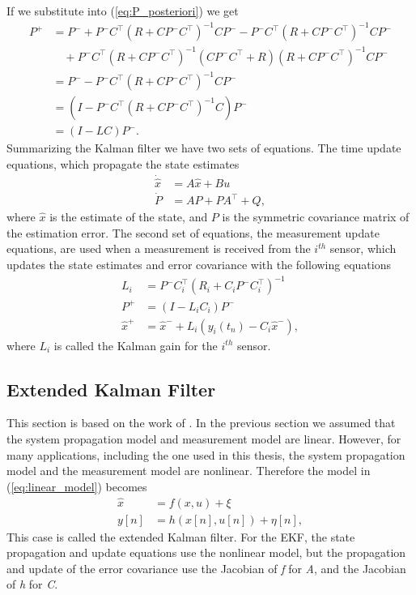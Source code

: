 If we substitute into (\ref{eq:P_posteriori}) we get
\begin{align*}
P^+&= P^-+P^-C^\top(R+CP^-C^\top)^{-1}CP^- -P^-C^\top(R+CP^-C^\top)^{-1}CP^- \\
   &  \quad +P^-C^\top(R+CP^-C^\top)^{-1}(CP^-C^\top+R)(R+CP^-C^\top)^{-1}CP^- \\
   &= P^- -P^-C^\top(R+CP^-C^\top)^{-1}CP^-\\
   &= (I-P^-C^\top(R+CP^-C^\top)^{-1}C)P^- \\
   &= (I-LC)P^-.
\end{align*}
Summarizing the Kalman filter we have two sets of equations. The time update equations, which propagate the state estimates
\begin{align}
\dot{\hat{x}}&= A\hat{x}+Bu\\
\dot{P}&= AP+PA^\top+Q,
\end{align}
where \begin{math} \hat{x} \end{math} is the estimate of the state, and \begin{math} P \end{math} is the symmetric covariance matrix of the estimation error. The second set of equations, the measurement update equations, are used when a measurement is received from the \begin{math} i^{th}\end{math} sensor, which updates the state estimates and error covariance with the following equations
\begin{align}
L_i &= P^-C_i^\top(R_i+C_iP^-C_i^\top)^{-1} \\
P^+ &= (I-L_iC_i)P^- \\
\hat{x}^+ &= \hat{x}^- +L_i(y_i(t_n)-C_i\hat{x}^-),
\end{align}
where \begin{math} L_i \end{math} is called the Kalman gain for the \begin{math} i^{th}\end{math} sensor.

\subsection{Extended Kalman Filter}{\label{sub:EKF}}

This section is based on the work of \cite{Beard2010}. In the previous section we assumed that the system propagation model and measurement model are linear. However, for many applications, including the one used in this thesis, the system propagation model and the measurement model are nonlinear. Therefore the model in (\ref{eq:linear_model}) becomes
\begin{align}
\hat{x}&=f(x,u)+\xi \\
y[n]&=h(x[n],u[n])+\eta[n],
\end{align}
This case is called the extended Kalman filter. For the EKF, the state propagation and update equations use the nonlinear model, but the propagation and update of the error covariance use the Jacobian of \textit{f} for \textit{A}, and the Jacobian of \textit{h} for \textit{C}.

